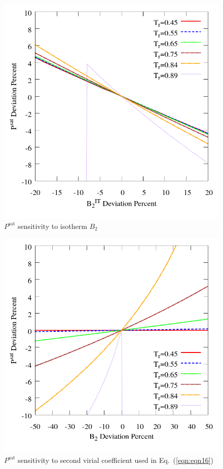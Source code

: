 \documentclass[%
 aip,
 jcp,
 sd,%
 amsmath,amssymb,
 reprint,%
]{revtex4-1}
\begin{document}
\begin{figure}
\includegraphics[scale=0.30]{Figures/FTF-B2xX-IT-C12-Psat.png}
\caption{$P^{\mathrm{sat}}$ sensitivity to isotherm $B_2$}
\label{fig:FTF-B2xX-IT-C12-Psat}
\end{figure}


\begin{figure}
\includegraphics[scale=0.30]{Figures/FTF-B2xX-C12-Psat.png}
\caption{$P^{\mathrm{sat}}$ sensitivity to second virial coefficient used in Eq.~(\ref{eqn:eqn16})}
\label{fig:FTF-B2xX-C12-Psat}
\end{figure}
\end{document}
